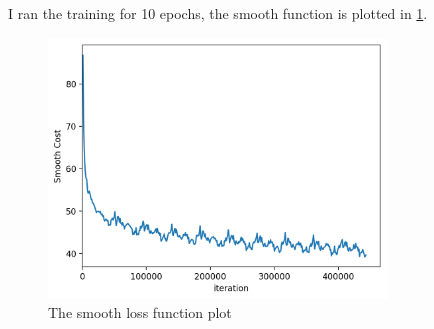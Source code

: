 \documentclass[12pt]{article}
\newenvironment{question}[2][Question]{\begin{trivlist}
\kern10pt
\item[\hskip \labelsep {\bfseries #1}\hskip \labelsep {\bfseries #2.}]}{\end{trivlist}}
\begin{document}
\begin{question}{ii}
I ran the training for 10 epochs, the smooth function is plotted in 
\cref{plt:smooth_lost_basic_rnn}.

\begin{figure}[h]
    \centering
    \includegraphics[width=0.8\textwidth]{./basic_cost.png}
    \caption{The smooth loss function plot}
    \label{plt:smooth_lost_basic_rnn}
\end{figure}
\end{question}
\end{document}
